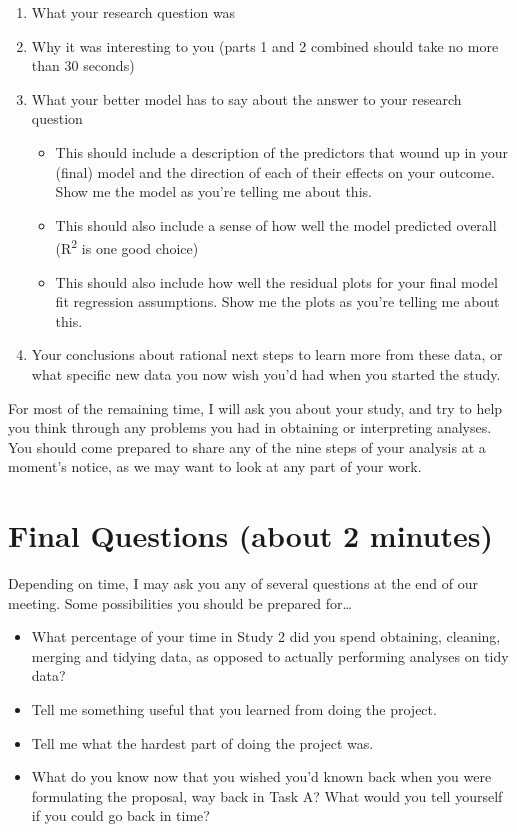 \documentclass[]{book}
\providecommand{\tightlist}{%
  \setlength{\itemsep}{0pt}\setlength{\parskip}{0pt}}
\theoremstyle{definition}
\theoremstyle{definition}
\theoremstyle{definition}
\theoremstyle{remark}
\begin{document}
\begin{enumerate}
\def\labelenumi{\alph{enumi}.}
\tightlist
\item
  What your research question was
\item
  Why it was interesting to you (parts 1 and 2 combined should take no
  more than 30 seconds)
\item
  What your better model has to say about the answer to your research
  question

  \begin{itemize}
  \tightlist
  \item
    This should include a description of the predictors that wound up in
    your (final) model and the direction of each of their effects on
    your outcome. Show me the model as you're telling me about this.
  \item
    This should also include a sense of how well the model predicted
    overall (R\textsuperscript{2} is one good choice)
  \item
    This should also include how well the residual plots for your final
    model fit regression assumptions. Show me the plots as you're
    telling me about this.
  \end{itemize}
\item
  Your conclusions about rational next steps to learn more from these
  data, or what specific new data you now wish you'd had when you
  started the study.
\end{enumerate}

For most of the remaining time, I will ask you about your study, and try
to help you think through any problems you had in obtaining or
interpreting analyses. You should come prepared to share any of the nine
steps of your analysis at a moment's notice, as we may want to look at
any part of your work.

\hypertarget{final-questions-about-2-minutes}{%
\section{Final Questions (about 2
minutes)}\label{final-questions-about-2-minutes}}

Depending on time, I may ask you any of several questions at the end of
our meeting. Some possibilities you should be prepared for\ldots{}

\begin{itemize}
\tightlist
\item
  What percentage of your time in Study 2 did you spend obtaining,
  cleaning, merging and tidying data, as opposed to actually performing
  analyses on tidy data?
\item
  Tell me something useful that you learned from doing the project.
\item
  Tell me what the hardest part of doing the project was.
\item
  What do you know now that you wished you'd known back when you were
  formulating the proposal, way back in Task A? What would you tell
  yourself if you could go back in time?
\end{itemize}


\end{document}
